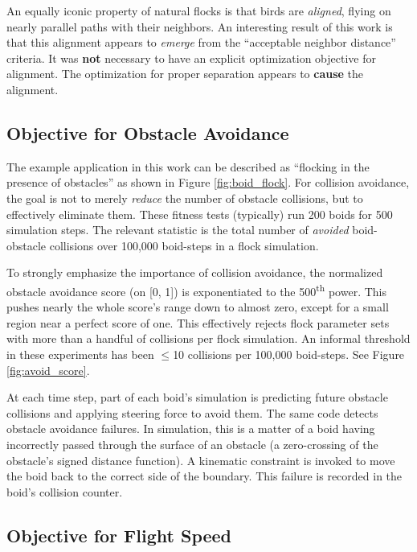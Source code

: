 \documentclass[letterpaper]{article}
\begin{document}
An equally iconic property of natural flocks is that birds are \textit{aligned}, flying on nearly parallel paths with their neighbors. An interesting result of this work is that this alignment appears to \textit{emerge} from the ``acceptable neighbor distance'' criteria. It was \textbf{not} necessary to have an explicit optimization objective for alignment. The optimization for proper separation appears to \textbf{cause} the alignment.

\subsection{Objective for Obstacle Avoidance}
\label{subsec:avoidance_objective}

The example application in this work can be described as ``flocking in the presence of obstacles'' as shown in Figure \ref{fig:boid_flock}. For collision avoidance, the goal is not to merely \textit{reduce} the number of obstacle collisions, but to effectively eliminate them. These fitness tests (typically) run 200 boids for 500 simulation steps. The relevant statistic is the total number of \textit{avoided} boid-obstacle collisions over 100,000 boid-steps in a flock simulation.

To strongly emphasize the importance of collision avoidance, the normalized obstacle avoidance score (on [0, 1]) is exponentiated to the 500\textsuperscript{th} power. This pushes nearly the whole score's range down to almost zero, except for a small region near a perfect score of one. This effectively rejects flock parameter sets with more than a handful of collisions per flock simulation. An informal threshold in these experiments has been {$\leq$}10 collisions per 100,000 boid-steps. See Figure \ref{fig:avoid_score}.

At each time step, part of each boid's simulation is predicting future obstacle collisions and applying steering force to avoid them. The same code detects obstacle avoidance failures. In simulation, this is a matter of a boid having incorrectly passed through the surface of an obstacle (a zero-crossing of the obstacle's signed distance function). A kinematic constraint is invoked to move the boid back to the correct side of the boundary. This failure is recorded in the boid's collision counter.

\subsection{Objective for Flight Speed}
\label{subsec:speed_objective}
\end{document}
